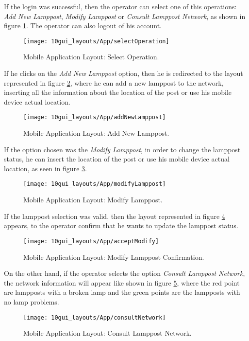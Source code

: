 If the login was successful, then the operator can select one of this operations: \textit{Add New Lamppost}, \textit{Modify Lamppost} or \textit{Consult Lamppost Network}, as shown in figure \ref{fig:selectOperation}. The operator can also logout of his account.

\begin{figure}[H]
	\centering	
	\texttt{[image: 10gui\_layouts/App/selectOperation]}
	\caption{Mobile Application Layout: Select Operation.}
	\label{fig:selectOperation}
\end{figure}

If he clicks on the \textit{Add New Lamppost} option, then he is redirected to the layout represented in figure \ref{fig:addNewLamppost}, where he can add a new lamppost to the network, inserting all the information about the location of the post or use his mobile device actual location. 

\begin{figure}[H]
	\centering	
	\texttt{[image: 10gui\_layouts/App/addNewLamppost]}
	\caption{Mobile Application Layout: Add New Lamppost.}
	\label{fig:addNewLamppost}
\end{figure}

If the option chosen was the \textit{Modify Lamppost}, in order to change the lamppost status, he can insert the location of the post or use his mobile device actual location, as seen in figure \ref{fig:modifyLamppost}.

\begin{figure}[H]
	\centering	
	\texttt{[image: 10gui\_layouts/App/modifyLamppost]}
	\caption{Mobile Application Layout: Modify Lamppost.}
	\label{fig:modifyLamppost}
\end{figure}

If the lamppost selection was valid, then the layout represented in figure \ref{fig:acceptModify} appears, to the operator confirm that he wants to update the lamppost status.

\begin{figure}[H]
	\centering	
	\texttt{[image: 10gui\_layouts/App/acceptModify]}
	\caption{Mobile Application Layout: Modify Lamppost Confirmation.}
	\label{fig:acceptModify}
\end{figure}

On the other hand, if the operator selects the option \textit{Consult Lamppost Network}, the network information will appear like shown in figure \ref{fig:consultNetwork}, where the red point are lampposts with a broken lamp and the green points are the lampposts with no lamp problems.

\begin{figure}[H]
	\centering	
	\texttt{[image: 10gui\_layouts/App/consultNetwork]}
	\caption{Mobile Application Layout: Consult Lamppost Network.}
	\label{fig:consultNetwork}
\end{figure}





